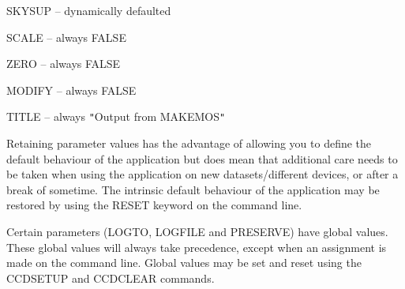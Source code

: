 {{{         \sstitem
            SKYSUP  -- dynamically defaulted

         \sstitem
            SCALE   -- always FALSE

         \sstitem
            ZERO    -- always FALSE

         \sstitem
            MODIFY  -- always FALSE

         \sstitem
            TITLE   -- always {\tt "}Output from MAKEMOS{\tt "}

      }
      Retaining parameter values has the advantage of allowing you to
      define the default behaviour of the application but does mean
      that additional care needs to be taken when using the application
      on new datasets/different devices, or after a break of sometime.
      The intrinsic default behaviour of the application may be
      restored by using the RESET keyword on the command line.

      Certain parameters (LOGTO, LOGFILE and PRESERVE) have global
      values. These global values will always take precedence, except
      when an assignment is made on the command line. Global values may
      be set and reset using the CCDSETUP and CCDCLEAR commands.
   }
}



